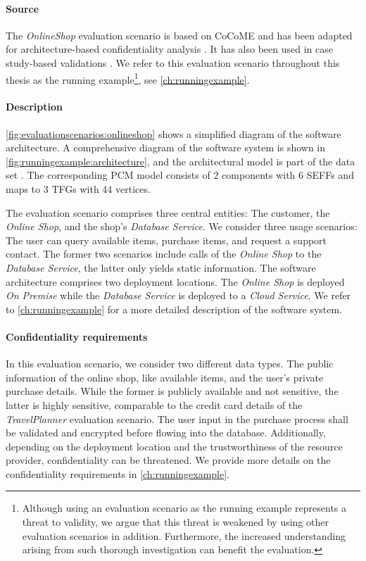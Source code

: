 \paragraph{Source} 
The \emph{OnlineShop} evaluation scenario is based on CoCoME \cite{rausch_common_2008} and has been adapted for architecture-based confidentiality analysis \cite{seifermann_data-driven_2019}.
It has also been used in case study-based validations \cite{walter_architectural_2022,kunz_efficient_2018,weimann_automated_2017,hahner_domain-specific_2020,hahner_model-based_2023,boltz_extensible_2024,hahner_architectural_2021,hahner_arcn_2024,hahner_classification_2023,hahner_architecture-based_2023}.
We refer to this evaluation scenario throughout this thesis as the running example\footnote{Although using an evaluation scenario as the running example represents a threat to validity, we argue that this threat is weakened by using other evaluation scenarios in addition. Furthermore, the increased understanding arising from such thorough investigation can benefit the evaluation.}, see \autoref{ch:runningexample}.

\paragraph{Description}
\autoref{fig:evaluationscenarios:onlineshop} shows a simplified diagram of the software architecture.
A comprehensive diagram of the software system is shown in \autoref{fig:runningexample:architecture}, and the architectural model is part of the data set \cite{dataset}. 
The corresponding \ac{PCM} model consists of 2 components with 6 \acp{SEFF} and maps to 3 \acp{TFG} with 44 vertices.

The evaluation scenario comprises three central entities: The customer, the \emph{Online Shop}, and the shop's \emph{Database Service}.
We consider three usage scenarios: The user can query available items, purchase items, and request a support contact.
The former two scenarios include calls of the \emph{Online Shop} to the \emph{Database Service}, the latter only yields static information.
The software architecture comprises two deployment locations.
The \emph{Online Shop} is deployed \emph{On Premise} while the \emph{Database Service} is deployed to a \emph{Cloud Service}.
We refer to \autoref{ch:runningexample} for a more detailed description of the software system.

\paragraph{Confidentiality requirements}
In this evaluation scenario, we consider two different data types.
The public information of the online shop, like available items, and the user's private purchase details.
While the former is publicly available and not sensitive, the latter is highly sensitive, comparable to the credit card details of the \emph{TravelPlanner} evaluation scenario.
The user input in the purchase process shall be validated and encrypted before flowing into the database.
Additionally, depending on the deployment location and the trustworthiness of the resource provider, confidentiality can be threatened.
We provide more details on the confidentiality requirements in \autoref{ch:runningexample}.

